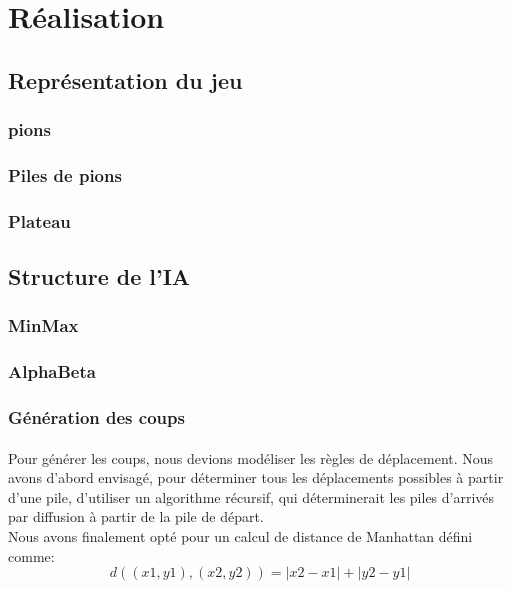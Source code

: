 \documentclass[article, backcover, french, nodocumentinfo]{upmethodology-document}
\begin{document}
	\section{Réalisation}
		\subsection{Représentation du jeu}
			\subsubsection{pions}
			\subsubsection{Piles de pions}
			\subsubsection{Plateau}
		\subsection{Structure de l'IA}
			\subsubsection{MinMax}
			\subsubsection{AlphaBeta}
			\subsubsection{Génération des coups}
				\paragraph{}
					Pour générer les coups, nous devions modéliser les règles de déplacement. Nous avons d'abord envisagé, pour déterminer tous les déplacements possibles à partir d'une pile, d'utiliser un algorithme récursif, qui déterminerait les piles d'arrivés par diffusion à partir de la pile de départ.\\
					Nous avons finalement opté pour un calcul de distance de Manhattan défini comme:
					\[d((x1,y1),(x2,y2)) = |x2 - x1| + |y2 -y1|\]
\end{document}
